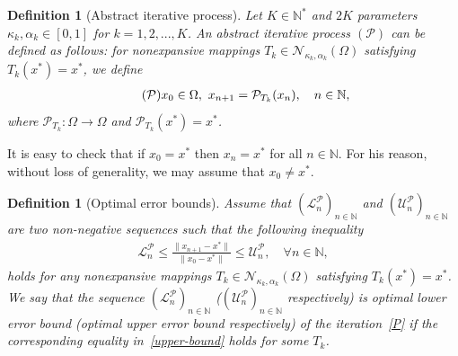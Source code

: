 \documentclass[a4paper, 11pt]{article}
\newtheorem{definition}[theorem]{Definition}
\begin{document}
\begin{definition}[Abstract iterative process]
Let $K \in \mathbb{N}^*$ and $2K$ parameters $\kappa_k,\alpha_k \in [0,1]$ for  $k = 1,2,...,K$. An abstract iterative process $(\mathcal{P})$ can be defined as follows: for nonexpansive mappings $T_k \in \mathcal{N}_{\kappa_k,\alpha_k}(\Omega)$ satisfying $T_k(x^*) = x^*$, we define
\begin{align}\tag{$\mathcal{P}$}
\label{P}
 x_0 \in \Omega, \ x_{n+1} = \mathcal{P}_{T_k}(x_n), \quad n \in \mathbb{N},
\end{align}
where $\mathcal{P}_{T_k}: \Omega \to \Omega$ and $\mathcal{P}_{T_k}(x^*)=x^*$. 
\end{definition}

It is easy to check that if $x_0 = x^*$ then $x_n = x^*$ for all $n \in \mathbb{N}$. For his reason, without loss of generality, we may assume that $x_0 \neq x^*$.

\begin{definition}[Optimal error bounds]
Assume that $(\mathcal{L}_n^\mathcal{P})_{n\in \mathbb{N}}$ and $(\mathcal{U}_n^\mathcal{P})_{n\in \mathbb{N}}$ are two non-negative sequences such that the following inequality
\begin{align}\label{upper-bound}
\mathcal{L}_n^\mathcal{P} \le \frac{\|x_{n+1} - x^*\|}{\|x_0 - x^*\|} \le \mathcal{U}_n^\mathcal{P} , \quad \forall n \in \mathbb{N},
\end{align}
holds for any nonexpansive mappings $T_k \in \mathcal{N}_{\kappa_k,\alpha_k}(\Omega)$ satisfying $T_k(x^*) = x^*$. We say that the sequence $(\mathcal{L}_n^\mathcal{P})_{n\in \mathbb{N}}$ ($(\mathcal{U}_n^\mathcal{P})_{n\in \mathbb{N}}$ respectively) is optimal lower error bound (optimal upper error bound respectively) of the iteration~\eqref{P} if the corresponding equality in~\eqref{upper-bound} holds for some $T_k$.
\end{definition}
\end{document}

